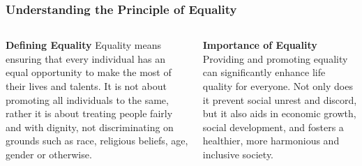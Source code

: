 \documentclass[5pt]{beamer}
\begin{document}
\begin{frame}
\frametitle{Understanding the Principle of Equality}
\begin{columns}
\begin{column}{0.45\textwidth}
\begin{block}{\textbf{Defining Equality}}
Equality means ensuring that every individual has an equal opportunity to make the most of their lives and talents. It is not about promoting all individuals to the same, rather it is about treating people fairly and with dignity, not discriminating on grounds such as race, religious beliefs, age, gender or otherwise.
\end{block}
\end{column}
\begin{column}{0.45\textwidth}
\begin{block}{\textbf{Importance of Equality}}
Providing and promoting equality can significantly enhance life quality for everyone. Not only does it prevent social unrest and discord, but it also aids in economic growth, social development, and fosters a healthier, more harmonious and inclusive society.
\end{block}
\end{column}
\end{columns}
\end{frame}
\end{document}
